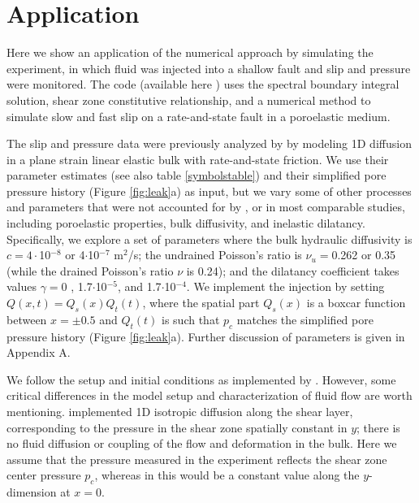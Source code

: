 \documentclass[draft]{agujournal2019}
\begin{document}
\section{Application} \label{sec:app}

Here we show an application of the numerical approach by simulating the  experiment, in which fluid was injected into a shallow fault and slip and pressure were monitored. The code (available here \cite{elias_rafn_heimisson_Poro_SBIM}) uses the spectral boundary integral solution, shear zone constitutive relationship, and a numerical method to simulate slow and fast slip on a rate-and-state fault in a poroelastic medium. 

The slip and pressure data were previously analyzed by  by modeling 1D diffusion in a plane strain linear elastic bulk with rate-and-state friction. We use their parameter estimates (see also table \ref{symbolstable}) and their simplified pore pressure history (Figure \ref{fig:leak}a) as input, but we vary some of other processes and parameters that were not accounted for by , or in most comparable studies, including poroelastic properties, bulk diffusivity, and inelastic dilatancy. Specifically, we explore a set of parameters where the bulk hydraulic diffusivity is $c = 4\cdot$10$^{-8}$ or 4$\cdot$10$^{-7}$ m$^2$/s; the undrained Poisson's ratio is $\nu_u = $0.262 or 0.35 (while the drained Poisson's ratio $\nu$ is 0.24); and the dilatancy coefficient takes values $\gamma = $0 , 1.7$\cdot$10$^{-5}$, and 1.7$\cdot$10$^{-4}$. We implement the injection by setting $Q(x,t) = Q_s(x) Q_t(t)$, where the spatial part $Q_s(x)$ is a boxcar function between $x = \pm 0.5$ and $Q_t(t)$ is such that $p_c$ matches the simplified pore pressure history (Figure \ref{fig:leak}a). Further discussion of parameters is given in Appendix A.

We follow the setup and initial conditions as implemented by . However, some critical differences in the model setup and characterization of fluid flow are worth mentioning.   implemented 1D isotropic diffusion along the shear layer, corresponding to the pressure in the shear zone spatially constant in $y$; there is no fluid diffusion or coupling of the flow and deformation in the bulk. Here we assume that the pressure measured in the experiment  reflects the shear zone center pressure $p_c$, whereas in  this would be a constant value along the $y$-dimension at $x = 0$. 
\end{document}
